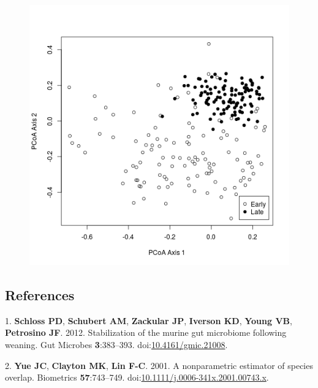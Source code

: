\documentclass[11pt,]{article}
\begin{document}
\begin{figure}[htbp]
\centering
\includegraphics{../results/figures/nmds_figure.png}
\caption{}
\end{figure}

\newpage

\subsection*{References}\label{references}

\hypertarget{refs}{}
\hypertarget{ref-Schloss2012}{}
1. \textbf{Schloss PD}, \textbf{Schubert AM}, \textbf{Zackular JP},
\textbf{Iverson KD}, \textbf{Young VB}, \textbf{Petrosino JF}. 2012.
Stabilization of the murine gut microbiome following weaning. Gut
Microbes \textbf{3}:383--393.
doi:\href{https://doi.org/10.4161/gmic.21008}{10.4161/gmic.21008}.

\hypertarget{ref-Yue2001}{}
2. \textbf{Yue JC}, \textbf{Clayton MK}, \textbf{Lin F-C}. 2001. A
nonparametric estimator of species overlap. Biometrics
\textbf{57}:743--749.
doi:\href{https://doi.org/10.1111/j.0006-341x.2001.00743.x}{10.1111/j.0006-341x.2001.00743.x}.
\end{document}
